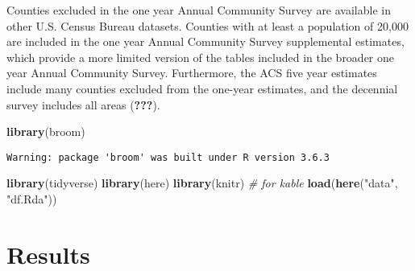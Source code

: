 \documentclass[12pt,twoside]{reedthesis}
\newenvironment{Shaded}{\begin{snugshade}}{\end{snugshade}}
\newcommand{\CommentTok}[1]{\textcolor[rgb]{0.56,0.35,0.01}{\textit{#1}}}
\newcommand{\KeywordTok}[1]{\textcolor[rgb]{0.13,0.29,0.53}{\textbf{#1}}}
\newcommand{\NormalTok}[1]{#1}
\newcommand{\StringTok}[1]{\textcolor[rgb]{0.31,0.60,0.02}{#1}}
\begin{document}
Counties excluded in the one year Annual Community Survey are available in other U.S. Census Bureau datasets. Counties with at least a population of 20,000 are included in the one year Annual Community Survey supplemental estimates, which provide a more limited version of the tables included in the broader one year Annual Community Survey. Furthermore, the ACS five year estimates include many counties excluded from the one-year estimates, and the decennial survey includes all areas ({\textbf{???}}).
\begin{Shaded}
\end{Shaded}
\begin{Shaded}
\begin{Highlighting}[]
\KeywordTok{library}\NormalTok{(broom)}
\end{Highlighting}
\end{Shaded}
\begin{verbatim}
Warning: package 'broom' was built under R version 3.6.3
\end{verbatim}
\begin{Shaded}
\begin{Highlighting}[]
\KeywordTok{library}\NormalTok{(tidyverse)}
\KeywordTok{library}\NormalTok{(here)}
\KeywordTok{library}\NormalTok{(knitr) }\CommentTok{# for kable}
\KeywordTok{load}\NormalTok{(}\KeywordTok{here}\NormalTok{(}\StringTok{"data"}\NormalTok{, }\StringTok{"df.Rda"}\NormalTok{))}
\end{Highlighting}
\end{Shaded}
\hypertarget{results}{%
\chapter{Results}\label{results}}
\end{document}

